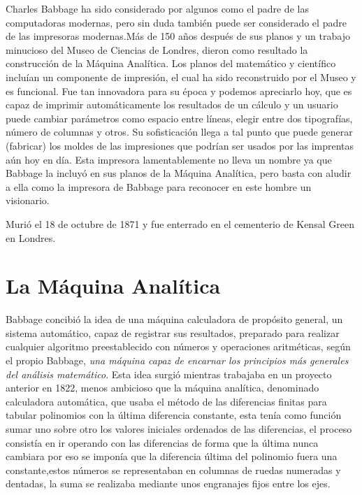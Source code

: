 \documentclass[runningheads,a4paper]{llncs}
\begin{document}
Charles Babbage ha sido considerado por algunos como el padre de las computadoras modernas, pero sin duda también puede ser considerado el padre de las impresoras modernas.Más de 150 años después de sus planos y un trabajo minucioso del Museo de Ciencias de Londres, dieron como resultado la construcción de la Máquina Analítica. Los planos del matemático y científico incluían un componente de impresión, el cual ha sido reconstruido por el Museo y es funcional. Fue tan innovadora para su época y podemos apreciarlo hoy, que es capaz de imprimir automáticamente los resultados de un cálculo y un usuario puede cambiar parámetros como espacio entre líneas, elegir entre dos tipografías, número de columnas y otros. Su sofisticación llega a tal punto que puede generar (fabricar) los moldes de las impresiones que podrían ser usados por las imprentas aún hoy en día. Esta impresora lamentablemente no lleva un nombre ya que Babbage la incluyó en sus planos de la Máquina Analítica, pero basta con aludir a ella como la impresora de Babbage para reconocer en este hombre un visionario.

Murió el 18 de octubre de 1871 y fue enterrado en el cementerio de Kensal Green en Londres.

\section{La Máquina Analítica}

Babbage concibió la idea de una máquina calculadora de propósito general, un sistema automático, capaz de 
registrar sus resultados, preparado para realizar cualquier algoritmo preestablecido con números y 
operaciones aritméticas, según el propio Babbage, \emph{una máquina capaz de encarnar los principios más 
generales del análisis matemático}. Esta idea surgió mientras trabajaba en un proyecto anterior en 1822, 
menos ambicioso que la máquina analítica, denominado calculadora automática, que usaba el método de las 
diferencias finitas para tabular polinomios con la última diferencia constante, esta tenía como función 
sumar uno sobre otro los valores iniciales ordenados de las diferencias, el proceso consistía en ir operando 
con las diferencias de forma que la última nunca cambiara por eso se imponía que la diferencia última del 
polinomio fuera una constante,estos números se representaban en columnas de ruedas numeradas y dentadas, 
la suma se realizaba mediante unos engranajes fijos entre los ejes.
\end{document}

